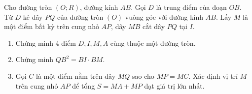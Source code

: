 \begin{ex}
	Cho đường tròn $(O;R)$, đường kính $AB$. Gọi $D$ là trung điểm của đoạn $OB$. Từ $D$ kẻ dây $PQ$ của đường tròn $(O)$ vuông góc với đường kính $AB$. Lấy $M$ là một điểm bất kỳ trên cung nhỏ $AP$, dây $MB$ cắt dây $PQ$ tại $I$.
	\begin{enumerate}
		\item Chứng minh 4 điểm $D, I, M, A$ cùng thuộc một đường tròn.
		\item Chứng minh $QB^2 = BI \cdot BM$.
		\item Gọi $C$ là một điểm nằm trên dây $MQ$ sao cho $MP = MC$. Xác định vị trí $M$ trên cung nhỏ $AP$ để tổng $S = MA + MP$ đạt giá trị lớn nhất.
	\end{enumerate}
\end{ex}
